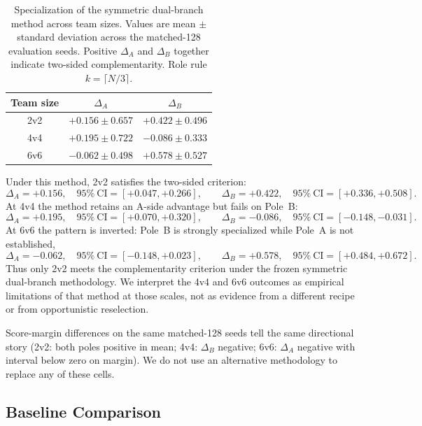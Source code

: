 \begin{table}[t]
\centering
\caption{Specialization of the symmetric dual-branch method across team
sizes. Values are mean $\pm$ standard deviation across the matched-128
evaluation seeds. Positive $\Delta_A$ and $\Delta_B$ together indicate
two-sided complementarity. Role rule $k=\lceil N/3\rceil$.}
\label{tab:main_specialization}
\begin{tabular}{c|cc}
\hline
Team size & $\Delta_A$ & $\Delta_B$ \\
\hline
2v2
& $+0.156 \pm 0.657$
& $+0.422 \pm 0.496$ \\ %
4v4
& $+0.195 \pm 0.722$
& $-0.086 \pm 0.333$ \\ %
6v6
& $-0.062 \pm 0.498$
& $+0.578 \pm 0.527$ \\ %
\hline
\end{tabular}
\end{table}

Under this method, 2v2 satisfies the two-sided criterion:
\[
\Delta_A=+0.156,\quad 95\%\ \mathrm{CI}=[+0.047,+0.266],
\qquad
\Delta_B=+0.422,\quad 95\%\ \mathrm{CI}=[+0.336,+0.508].
\]
At 4v4 the method retains an A-side advantage but fails on Pole~B:
\[
\Delta_A=+0.195,\quad 95\%\ \mathrm{CI}=[+0.070,+0.320],
\qquad
\Delta_B=-0.086,\quad 95\%\ \mathrm{CI}=[-0.148,-0.031].
\]
At 6v6 the pattern is inverted: Pole~B is strongly specialized while
Pole~A is not established,
\[
\Delta_A=-0.062,\quad 95\%\ \mathrm{CI}=[-0.148,+0.023],
\qquad
\Delta_B=+0.578,\quad 95\%\ \mathrm{CI}=[+0.484,+0.672].
\]
Thus only 2v2 meets the complementarity criterion under the frozen
symmetric dual-branch methodology. We interpret the 4v4 and 6v6 outcomes
as empirical limitations of that method at those scales, not as evidence
from a different recipe or from opportunistic reselection.

Score-margin differences on the same matched-128 seeds tell the same
directional story (2v2: both poles positive in mean; 4v4: \(\Delta_B\)
negative; 6v6: \(\Delta_A\) negative with interval below zero on margin).
We do not use an alternative methodology to replace any of these cells.


\subsection{Baseline Comparison}
\label{sec:baselines-provenance}


